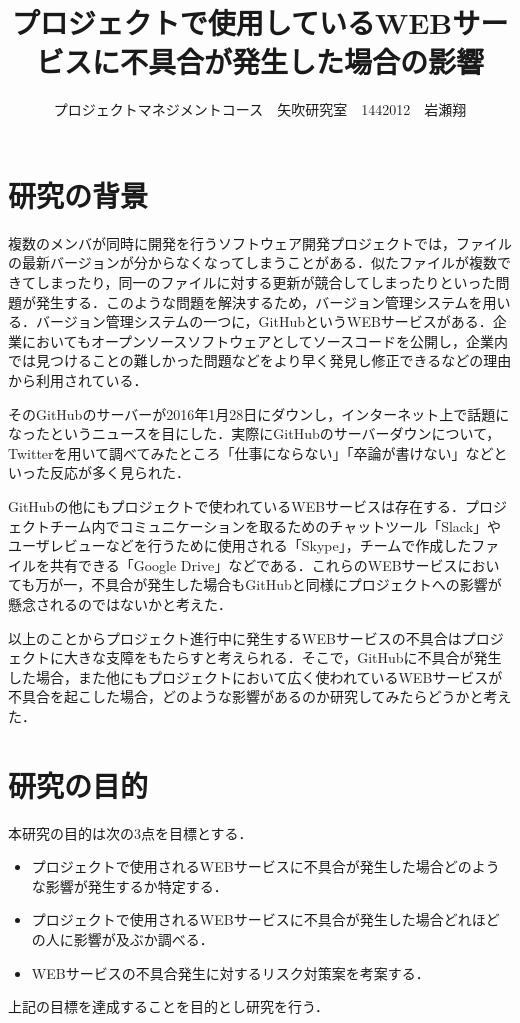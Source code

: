 \documentclass[uplatex,twocolumn,dvipdfmx]{jsarticle}
\title{\vspace{-5mm}\fontsize{14pt}{0pt}\selectfont プロジェクトで使用しているWEBサービスに不具合が発生した場合の影響}
\author{\normalsize プロジェクトマネジメントコース　矢吹研究室　1442012　岩瀬翔}
\date{}
\begin{document}
\fontsize{10.5pt}{\baselineskip}\selectfont
\maketitle





\section{研究の背景}
複数のメンバが同時に開発を行うソフトウェア開発プロジェクトでは，ファイルの最新バージョンが分からなくなってしまうことがある．似たファイルが複数できてしまったり，同一のファイルに対する更新が競合してしまったりといった問題が発生する．このような問題を解決するため，バージョン管理システムを用いる．バージョン管理システムの一つに，GitHubというWEBサービスがある．企業においてもオープンソースソフトウェアとしてソースコードを公開し，企業内では見つけることの難しかった問題などをより早く発見し修正できるなどの理由から利用されている\cite{01}．

そのGitHubのサーバーが2016年1月28日にダウンし，インターネット上で話題になったというニュースを目にした．実際にGitHubのサーバーダウンについて，Twitterを用いて調べてみたところ「仕事にならない」「卒論が書けない」などといった反応が多く見られた\cite{02}．

GitHubの他にもプロジェクトで使われているWEBサービスは存在する．プロジェクトチーム内でコミュニケーションを取るためのチャットツール「Slack」やユーザレビューなどを行うために使用される「Skype」，チームで作成したファイルを共有できる「Google Drive」などである．これらのWEBサービスにおいても万が一，不具合が発生した場合もGitHubと同様にプロジェクトへの影響が懸念されるのではないかと考えた．

以上のことからプロジェクト進行中に発生するWEBサービスの不具合はプロジェクトに大きな支障をもたらすと考えられる．そこで，GitHubに不具合が発生した場合，また他にもプロジェクトにおいて広く使われているWEBサービスが不具合を起こした場合，どのような影響があるのか研究してみたらどうかと考えた．

\section{研究の目的}
本研究の目的は次の3点を目標とする．
\begin{itemize}
 \item プロジェクトで使用されるWEBサービスに不具合が発生した場合どのような影響が発生するか特定する．
 \item プロジェクトで使用されるWEBサービスに不具合が発生した場合どれほどの人に影響が及ぶか調べる．
 \item WEBサービスの不具合発生に対するリスク対策案を考案する．
\end{itemize}
上記の目標を達成することを目的とし研究を行う．
\end{document}

